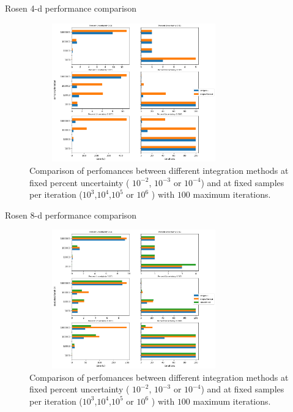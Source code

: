 \documentclass[t,handout,professionalfonts]{beamer}
\begin{document}
\begin{frame}{Rosen 4-d performance comparison}
	\tiny
	\vspace{-0.4cm}
	\begin{figure}
		\includegraphics[height=6cm,width=9cm]{../performance_plots/rosen4-d_no_stratified.png}
		\caption{Comparison of perfomances between different integration methods at fixed percent uncertainty ( $10^{-2}$, $10^{-3}$ or $10^{-4}$) and at fixed samples per iteration ($10^3$,$10^4$,$10^5$ or $10^6$ ) with $100$ maximum iterations.}
	\end{figure}
	
\end{frame}

\begin{frame}{Rosen 8-d performance comparison}
	\tiny
	\vspace{-0.4cm}
	\begin{figure}
		\includegraphics[height=6cm,width=9cm]{../performance_plots/rosen8-d.png}
		\caption{Comparison of perfomances between different integration methods at fixed percent uncertainty ( $10^{-2}$, $10^{-3}$ or $10^{-4}$) and at fixed samples per iteration ($10^3$,$10^4$,$10^5$ or $10^6$ ) with $100$ maximum iterations.}
	\end{figure}
	
\end{frame}
\end{document}
